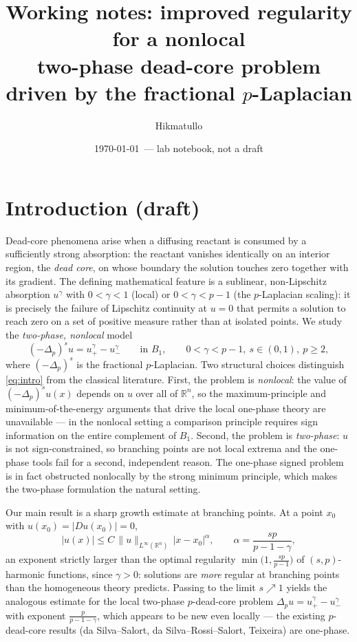 \documentclass[11pt]{amsart}
\title[Notes: nonlocal $p$-dead-core]{Working notes: improved regularity for a nonlocal\\ two-phase dead-core problem driven by the fractional $p$-Laplacian}
\author{Hikmatullo}
\date{\today\ --- lab notebook, not a draft}
\theoremstyle{plain}
\theoremstyle{definition}
\theoremstyle{remark}
\newcommand{\R}{\mathbb{R}}
\newcommand{\fpl}[1]{(-\Delta_p)^{s}#1}            %
\newcommand{\al}{\alpha}
\begin{document}
\maketitle
\tableofcontents
\section{Introduction (draft)}\label{sec:intro}
Dead-core phenomena arise when a diffusing reactant is consumed by a
sufficiently strong absorption: the reactant vanishes identically on an
interior region, the \emph{dead core}, on whose boundary the solution
touches zero together with its gradient. The defining mathematical feature
is a sublinear, non-Lipschitz absorption $u^\gamma$ with $0<\gamma<1$
(local) or $0<\gamma<p-1$ (the $p$-Laplacian scaling): it is precisely the
failure of Lipschitz continuity at $u=0$ that permits a solution to reach
zero on a set of positive measure rather than at isolated points. We study
the \emph{two-phase, nonlocal} model
\begin{equation}\label{eq:intro}
  \fpl{u}=u_+^{\gamma}-u_-^{\gamma}\qquad\text{in }B_1,
  \qquad 0<\gamma<p-1,\ s\in(0,1),\ p\ge2,
\end{equation}
where $\fpl{}$ is the fractional $p$-Laplacian. Two structural choices
distinguish \eqref{eq:intro} from the classical literature. First, the
problem is \emph{nonlocal}: the value of $\fpl{u}(x)$ depends on $u$ over
all of $\R^n$, so the maximum-principle and minimum-of-the-energy arguments
that drive the local one-phase theory are unavailable --- in the nonlocal
setting a comparison principle requires sign information on the entire
complement of $B_1$. Second, the problem is \emph{two-phase}: $u$ is not
sign-constrained, so branching points are not local extrema and the
one-phase tools fail for a second, independent reason. The one-phase
signed problem is in fact obstructed nonlocally by the strong minimum
principle, which makes the two-phase formulation the natural setting.

Our main result is a sharp growth estimate at branching points. At a point
$x_0$ with $u(x_0)=|Du(x_0)|=0$,
\begin{equation}\label{eq:introgrowth}
  |u(x)|\le C\,\|u\|_{L^\infty(\R^n)}\,|x-x_0|^{\al},
  \qquad \al=\frac{sp}{p-1-\gamma},
\end{equation}
an exponent strictly larger than the optimal regularity
$\min\!\big(1,\tfrac{sp}{p-1}\big)$ of $(s,p)$-harmonic functions, since
$\gamma>0$: solutions are \emph{more} regular at branching points than the
homogeneous theory predicts. Passing to the limit $s\nearrow1$ yields the
analogous estimate for the local two-phase $p$-dead-core problem
$\Delta_pu=u_+^\gamma-u_-^\gamma$ with exponent $\frac{p}{p-1-\gamma}$,
which appears to be new even locally --- the existing $p$-dead-core results
(da Silva--Salort, da Silva--Rossi--Salort, Teixeira) are one-phase.
\end{document}
